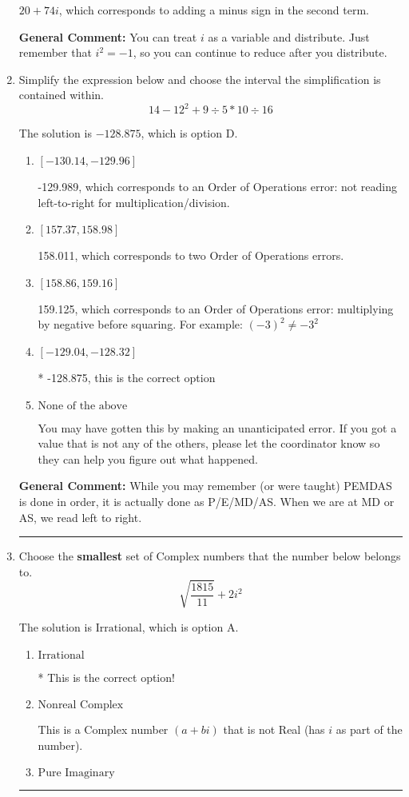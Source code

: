 \documentclass{extbook}[14pt]
\newcommand{\litem}[1]{\item #1

\rule{\textwidth}{0.4pt}}
\begin{document}
\begin{enumerate}
{\begin{enumerate}[label=\Alph*.]
 $20 + 74 i$, which corresponds to adding a minus sign in the second term.
\end{enumerate}

\textbf{General Comment:} You can treat $i$ as a variable and distribute. Just remember that $i^2=-1$, so you can continue to reduce after you distribute.
}
\litem{
Simplify the expression below and choose the interval the simplification is contained within.
\[ 14 - 12^2 + 9 \div 5 * 10 \div 16 \]

The solution is \( -128.875 \), which is option D.\begin{enumerate}[label=\Alph*.]
\item \( [-130.14, -129.96] \)

 -129.989, which corresponds to an Order of Operations error: not reading left-to-right for multiplication/division.
\item \( [157.37, 158.98] \)

 158.011, which corresponds to two Order of Operations errors.
\item \( [158.86, 159.16] \)

 159.125, which corresponds to an Order of Operations error: multiplying by negative before squaring. For example: $(-3)^2 \neq -3^2$
\item \( [-129.04, -128.32] \)

* -128.875, this is the correct option
\item \( \text{None of the above} \)

 You may have gotten this by making an unanticipated error. If you got a value that is not any of the others, please let the coordinator know so they can help you figure out what happened.
\end{enumerate}

\textbf{General Comment:} While you may remember (or were taught) PEMDAS is done in order, it is actually done as P/E/MD/AS. When we are at MD or AS, we read left to right.
}
\litem{
Choose the \textbf{smallest} set of Complex numbers that the number below belongs to.
\[ \sqrt{\frac{1815}{11}}+2i^2 \]

The solution is \( \text{Irrational} \), which is option A.\begin{enumerate}[label=\Alph*.]
\item \( \text{Irrational} \)

* This is the correct option!
\item \( \text{Nonreal Complex} \)

This is a Complex number $(a+bi)$ that is not Real (has $i$ as part of the number).
\item \( \text{Pure Imaginary} \)


\end{enumerate}}
\end{enumerate}
\end{document}
